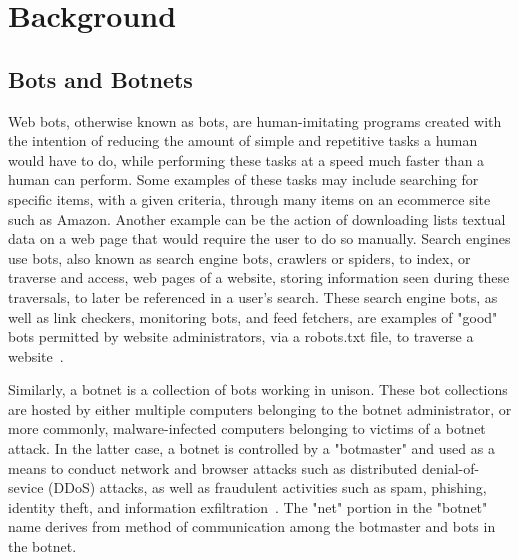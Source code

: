 
\section{Background}\label{sec:background}

\subsection{Bots and Botnets}\label{subsec:bots-and-botnets}
Web bots, otherwise known as bots, are human-imitating programs created with the intention of reducing the amount of simple and repetitive tasks a human would have to do, while performing these tasks at a speed much faster than a human can perform.
Some examples of these tasks may include searching for specific items, with a given criteria, through many items on an ecommerce site such as Amazon.
Another example can be the action of downloading lists textual data on a web page that would require the user to do so manually.
Search engines use bots, also known as search engine bots, crawlers or spiders, to index, or traverse and access, web pages of a website, storing information seen during these traversals, to later be referenced in a user's search.
These search engine bots, as well as link checkers, monitoring bots, and feed fetchers, are examples of "good" bots permitted by website administrators, via a robots.txt file, to traverse a website~\cite{ROVETTA2020102577}.

Similarly, a botnet is a collection of bots working in unison.
These bot collections are hosted by either multiple computers belonging to the botnet administrator, or more commonly, malware-infected computers belonging to victims of a botnet attack.
In the latter case, a botnet is controlled by a "botmaster" and used as a means to conduct network and browser attacks such as distributed denial-of-sevice (DDoS) attacks, as well as fraudulent activities such as spam, phishing, identity theft, and information exfiltration~\cite{inproceedings}.
The "net" portion in the "botnet" name derives from method of communication among the botmaster and bots in the botnet.

